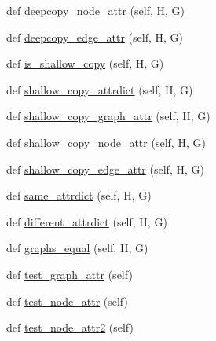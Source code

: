\begin{DoxyCompactItemize}
\item 
def \hyperlink{classnetworkx_1_1classes_1_1tests_1_1test__graph_1_1BaseAttrGraphTester_a5191781174c9e80192f99c16bf77bb0f}{deepcopy\+\_\+node\+\_\+attr} (self, H, G)
\item 
def \hyperlink{classnetworkx_1_1classes_1_1tests_1_1test__graph_1_1BaseAttrGraphTester_a62699646d0dc45b062c58e16e1aface0}{deepcopy\+\_\+edge\+\_\+attr} (self, H, G)
\item 
def \hyperlink{classnetworkx_1_1classes_1_1tests_1_1test__graph_1_1BaseAttrGraphTester_ad3af2d4303169c1f7440a97d01f3b797}{is\+\_\+shallow\+\_\+copy} (self, H, G)
\item 
def \hyperlink{classnetworkx_1_1classes_1_1tests_1_1test__graph_1_1BaseAttrGraphTester_a7f2d21a904c3a0677707ff36686d8f3c}{shallow\+\_\+copy\+\_\+attrdict} (self, H, G)
\item 
def \hyperlink{classnetworkx_1_1classes_1_1tests_1_1test__graph_1_1BaseAttrGraphTester_a7586408f7abf3b0a8d5439da2f8c2b42}{shallow\+\_\+copy\+\_\+graph\+\_\+attr} (self, H, G)
\item 
def \hyperlink{classnetworkx_1_1classes_1_1tests_1_1test__graph_1_1BaseAttrGraphTester_a28c7bbec098d20499e12c85da00eb3d5}{shallow\+\_\+copy\+\_\+node\+\_\+attr} (self, H, G)
\item 
def \hyperlink{classnetworkx_1_1classes_1_1tests_1_1test__graph_1_1BaseAttrGraphTester_a2d9403911acb6d8df095621f0204d9e8}{shallow\+\_\+copy\+\_\+edge\+\_\+attr} (self, H, G)
\item 
def \hyperlink{classnetworkx_1_1classes_1_1tests_1_1test__graph_1_1BaseAttrGraphTester_a96449b7e6fffc5ca580a98c3984e1cd8}{same\+\_\+attrdict} (self, H, G)
\item 
def \hyperlink{classnetworkx_1_1classes_1_1tests_1_1test__graph_1_1BaseAttrGraphTester_ab6b02b39ebcf205202c38acdedd69b76}{different\+\_\+attrdict} (self, H, G)
\item 
def \hyperlink{classnetworkx_1_1classes_1_1tests_1_1test__graph_1_1BaseAttrGraphTester_a12cf07952334e03480d2648e25f0af16}{graphs\+\_\+equal} (self, H, G)
\item 
def \hyperlink{classnetworkx_1_1classes_1_1tests_1_1test__graph_1_1BaseAttrGraphTester_a1d2391d08b9823d540b52c14153a9107}{test\+\_\+graph\+\_\+attr} (self)
\item 
def \hyperlink{classnetworkx_1_1classes_1_1tests_1_1test__graph_1_1BaseAttrGraphTester_abe4f3654f6ef5dc984457e3944ddd358}{test\+\_\+node\+\_\+attr} (self)
\item 
def \hyperlink{classnetworkx_1_1classes_1_1tests_1_1test__graph_1_1BaseAttrGraphTester_ab74684ba176f79a9fdf2fdede4758934}{test\+\_\+node\+\_\+attr2} (self)

\end{DoxyCompactItemize}

